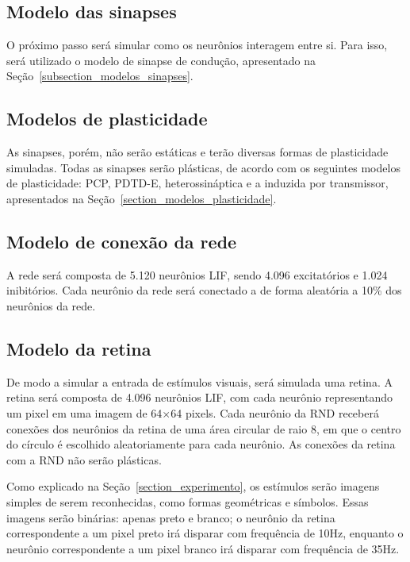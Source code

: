 \subsection{Modelo das sinapses}

O próximo passo será simular como os neurônios interagem entre si. Para isso, será utilizado o modelo de sinapse de condução,
apresentado na Seção~\ref{subsection_modelos_sinapses}.

\subsection{Modelos de plasticidade}

As sinapses, porém, não serão estáticas e terão diversas formas de plasticidade simuladas. Todas as sinapses serão plásticas, de
acordo com os seguintes modelos de plasticidade: PCP, PDTD-E, heterossináptica e a induzida por transmissor, apresentados na
Seção~\ref{section_modelos_plasticidade}.

\subsection{Modelo de conexão da rede}

A rede será composta de 5.120 neurônios LIF, sendo 4.096 excitatórios e 1.024 inibitórios. Cada neurônio da rede será conectado a
de forma aleatória a 10\% dos neurônios da rede.

\subsection{Modelo da retina}

De modo a simular a entrada de estímulos visuais, será simulada uma retina. A retina será composta de 4.096 neurônios LIF, com
cada neurônio representando um pixel em uma imagem de 64$\times$64 pixels. Cada neurônio da RND receberá conexões dos neurônios da
retina de uma área circular de raio 8, em que o centro do círculo é escolhido aleatoriamente para cada neurônio. As conexões da
retina com a RND não serão plásticas.

Como explicado na Seção~\ref{section_experimento}, os estímulos serão imagens simples de serem reconhecidas, como formas
geométricas e símbolos. Essas imagens serão binárias: apenas preto e branco; o neurônio da retina correspondente a um pixel preto
irá disparar com frequência de 10Hz, enquanto o neurônio correspondente a um pixel branco irá disparar com frequência de 35Hz.

